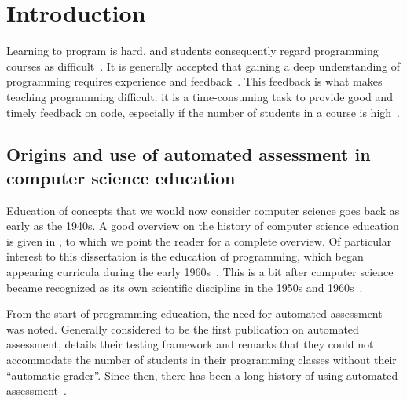 \documentclass[../main]{subfiles}
\begin{document}
\chapter{Introduction}\label{ch:introduction}

Learning to program is hard, and students consequently regard programming courses as difficult~\autocite{robinsLearningTeachingProgramming2003,simoesNatureProgrammingExercises2020}.
It is generally accepted that gaining a deep understanding of programming requires experience and feedback~\autocite{gomesEnvironmentImproveProgramming2007}.
This feedback is what makes teaching programming difficult: it is a time-consuming task to provide good and timely feedback on code, especially if the number of students in a course is high~\autocite{zavalaUseSemanticbasedAIG2018,staubitzRepositoryOpenAutogradable2017,queirosPexilProgrammingExercises2011,pirttinenCrowdsourcingProgrammingAssignments2018,gulwaniFeedbackGenerationPerformance2014,tangDatadrivenTestCase2016}.

\section{Origins and use of automated assessment in computer science education}\label{sec:automated-assessment-in-computer-science-education}

Education of concepts that we would now consider computer science goes back as early as the 1940s.
A good overview on the history of computer science education is given in \textcite{tedreChangingAimsComputing2018}, to which we point the reader for a complete overview.
Of particular interest to this dissertation is the education of programming, which began appearing curricula during the early 1960s~\autocite{simonEmergenceComputingEducation2015}.
This is a bit after computer science became recognized as its own scientific discipline in the 1950s and 1960s~\autocite{hopcroftComputerScienceEmergence1987,atchisonComputerScienceNew1971,gornComputerInformationSciences1963,knuthComputerScienceIts1974,denningScienceComputerScience2013}.

From the start of programming education, the need for automated assessment was noted.
Generally considered to be the first publication on automated assessment, \textcite{hollingsworthAutomaticGradersProgramming1960} details their testing framework and remarks that they could not accommodate the number of students in their programming classes without their ``automatic grader''.
Since then, there has been a long history of using automated assessment~\autocite{ala-mutkaSurveyAutomatedAssessment2005,douceAutomaticTestbasedAssessment2005,ihantolaReviewRecentSystems2010,paivaAutomatedAssessmentComputer2022,combefisAutomatedCodeAssessment2022,nayakAutomatedAssessmentTools2022,messerAutomatedGradingFeedback2024}.
\end{document}
